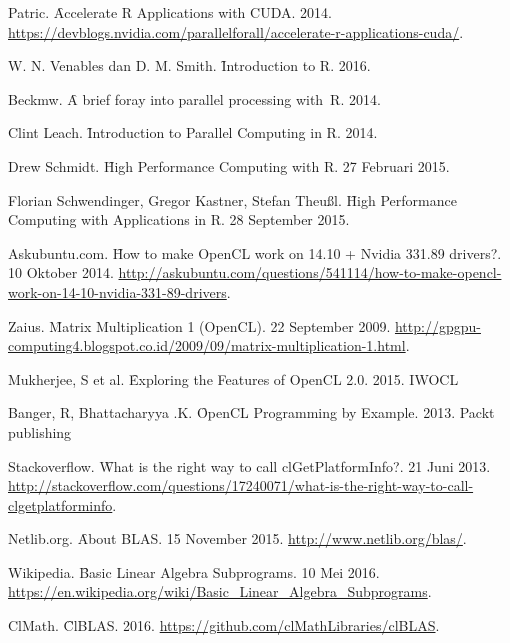 %
% 

% 
% 
\begin{thebibliography}{4}

{Patric. \f{Accelerate R Applications with CUDA}. 2014. \url{https://devblogs.nvidia.com/parallelforall/accelerate-r-applications-cuda/}.}

{W. N. Venables dan D. M. Smith. \f{Introduction to R}. 2016.}

{Beckmw. \f{A brief foray into parallel processing with R}. 2014. }

{Clint Leach. \f{Introduction to Parallel Computing in R}. 2014. }

{Drew Schmidt. \f{High Performance Computing with R}. 27 Februari 2015. }

{Florian Schwendinger, Gregor Kastner, Stefan Theußl. \f{High Performance Computing with Applications in R}. 28 September 2015. }

{Askubuntu.com. \f{How to make OpenCL work on 14.10 + Nvidia 331.89 drivers?}. 10 Oktober 2014. \url{http://askubuntu.com/questions/541114/how-to-make-opencl-work-on-14-10-nvidia-331-89-drivers}.}

{Zaius. \f{Matrix Multiplication 1 (OpenCL)}. 22 September 2009. \url{http://gpgpu-computing4.blogspot.co.id/2009/09/matrix-multiplication-1.html}.}

{Mukherjee, S et al. \f{Exploring the Features of OpenCL 2.0}. 2015. IWOCL }

{Banger, R, Bhattacharyya .K. \f{OpenCL Programming by Example}. 2013. Packt publishing }

{Stackoverflow. \f{What is the right way to call clGetPlatformInfo?}. 21 Juni 2013. \url{http://stackoverflow.com/questions/17240071/what-is-the-right-way-to-call-clgetplatforminfo}.}

{Netlib.org. \f{About BLAS}. 15 November 2015. \url{http://www.netlib.org/blas/​​}.}

{Wikipedia. \f{Basic Linear Algebra Subprograms}. 10 Mei 2016. \url{https://en.wikipedia.org/wiki/Basic_Linear_Algebra_Subprograms}.}

{ClMath. \f{ClBLAS}. 2016. \url{https://github.com/clMathLibraries/clBLAS}.}


\end{thebibliography}
